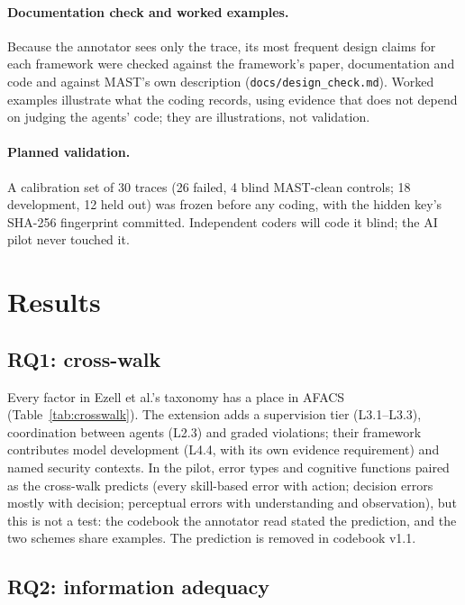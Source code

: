 \documentclass[10pt,a4paper]{article}
\newcommand{\code}[1]{\texttt{#1}}
\begin{document}
\paragraph{Documentation check and worked examples.} Because the annotator sees
only the trace, its most frequent design claims for each framework were checked
against the framework's paper, documentation and code and against MAST's own
description (\code{docs/design\_check.md}). Worked examples illustrate what the
coding records, using evidence that does not depend on judging the agents' code;
they are illustrations, not validation.

\paragraph{Planned validation.} A calibration set of 30 traces (26 failed, 4 blind
MAST-clean controls; 18 development, 12 held out) was frozen before any coding,
with the hidden key's SHA-256 fingerprint committed. Independent coders will code
it blind; the AI pilot never touched it.

\section{Results}
\label{sec:results}

\subsection{RQ1: cross-walk}

Every factor in Ezell et al.'s taxonomy has a place in AFACS
(Table~\ref{tab:crosswalk}). The extension adds a supervision tier (L3.1--L3.3),
coordination between agents (L2.3) and graded violations; their framework
contributes model development (L4.4, with its own evidence requirement) and named
security contexts. In the pilot, error types and cognitive functions paired as the
cross-walk predicts (every skill-based error with action; decision errors mostly
with decision; perceptual errors with understanding and observation), but this is
not a test: the codebook the annotator read stated the prediction, and the two
schemes share examples. The prediction is removed in codebook v1.1.

\subsection{RQ2: information adequacy}
\end{document}
